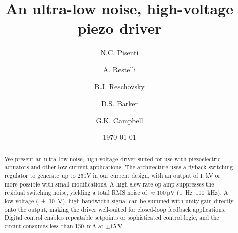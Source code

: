 \documentclass[aip,rsi,reprint]{revtex4-1} %
\begin{document}

\title{An ultra-low noise, high-voltage piezo driver}



\author{N.C. Pisenti}
\author{A. Restelli}
\author{B.J. Reschovsky}
\author{D.S. Barker}
\author{G.K. Campbell}


\date{\today}

\begin{abstract}
We present an ultra-low noise, high voltage driver suited for use with piezoelectric actuators and other low-current applications. 
The architecture uses a flyback switching regulator to generate up to 250V in our current design, with an output of \SI{1}{\kilo\volt} or more possible with small modifications. 
A high slew-rate op-amp suppresses the residual switching noise, yielding a total RMS noise of $\approx\SI{100}{\micro\volt}$ (\SI{1}{\hertz}--\SI{100}{\kilo\hertz}).
A low-voltage (\SI{\pm 10}{\volt}), high bandwidth signal can be summed with unity gain directly onto the output, making the driver well-suited for closed-loop feedback applications.
Digital control enables repeatable setpoints or sophisticated control logic, and the circuit consumes less than \SI{150}{\milli\ampere} at $\pm\SI{15}{\volt}$.
\end{abstract}
\end{document}
